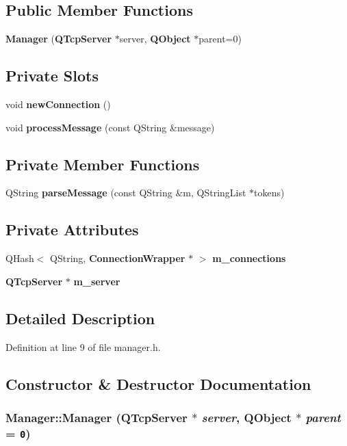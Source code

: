 \subsection*{Public Member Functions}
\begin{CompactItemize}
\item 
{\bf Manager} ({\bf QTcpServer} $\ast$server, {\bf QObject} $\ast$parent=0)
\end{CompactItemize}
\subsection*{Private Slots}
\begin{CompactItemize}
\item 
void {\bf newConnection} ()
\item 
void {\bf processMessage} (const QString \&message)
\end{CompactItemize}
\subsection*{Private Member Functions}
\begin{CompactItemize}
\item 
QString {\bf parseMessage} (const QString \&m, QStringList $\ast$tokens)
\end{CompactItemize}
\subsection*{Private Attributes}
\begin{CompactItemize}
\item 
QHash$<$ QString, {\bf ConnectionWrapper} $\ast$ $>$ {\bf m\_\-connections}
\item 
{\bf QTcpServer} $\ast$ {\bf m\_\-server}
\end{CompactItemize}


\subsection{Detailed Description}


Definition at line 9 of file manager.h.

\subsection{Constructor \& Destructor Documentation}
\subsubsection{\setlength{\rightskip}{0pt plus 5cm}Manager::Manager ({\bf QTcpServer} $\ast$ {\em server}, {\bf QObject} $\ast$ {\em parent} = {\tt 0})}\label{classManager_19000c19438e7e30381ed764ac4ef61a}




